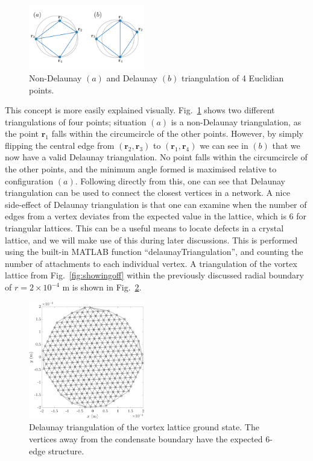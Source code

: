 \begin{figure}\centering
    \includegraphics[width=0.45\textwidth]{Images/ch6_phasegineer/imgs/delaun}
    \caption{Non-Delaunay $(a)$ and Delaunay $(b)$ triangulation of 4 Euclidian points.}\label{fig:delaun}
\end{figure}
This concept is more easily explained visually. Fig.~\ref{fig:delaun} shows two different triangulations of four points; situation $(a)$ is a non-Delaunay triangulation, as the point $\mathbf{r}_1$ falls within the circumcircle of the other points. However, by simply flipping the central edge from $(\mathbf{r}_2, \mathbf{r}_3)$ to $(\mathbf{r}_1, \mathbf{r}_4)$ we can see in $(b)$ that we now have a valid Delaunay triangulation. No point falls within the circumcircle of the other points, and the minimum angle formed is maximised relative to configuration $(a)$. Following directly from this, one can see that Delaunay triangulation can be used to connect the closest vertices in a network. A nice side-effect of Delaunay triangulation is that one can examine when the number of edges from a vertex deviates from the expected value in the lattice, which is 6 for triangular lattices. This can be a useful means to locate defects in a crystal lattice, and we will make use of this during later discussions. This is performed using the built-in \textsc{MATLAB} function ``delaunayTriangulation'', and counting the number of attachments to each individual vertex. A triangulation of the vortex lattice from Fig.~\ref{fig:showingoff} within the previously discussed radial boundary of $r=2\times 10^{-4}$ m is shown in Fig.~\ref{fig:delaun_vtxlatt}.

\begin{figure}\centering
    \includegraphics[width=0.45\textwidth]{Images/ch4_vtx/Del_tr_VTXLATT}
    \caption{Delaunay triangulation of the vortex lattice ground state. The vertices away from the condensate boundary have the expected 6-edge structure.}\label{fig:delaun_vtxlatt}
\end{figure}

